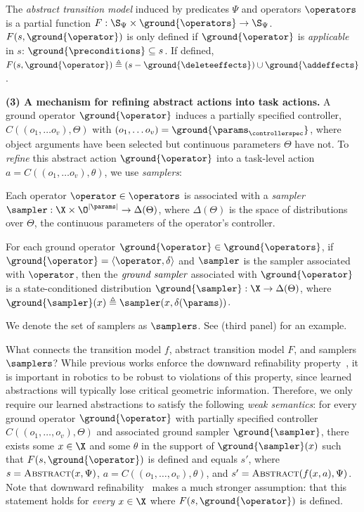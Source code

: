 \begin{defn}
\label{def:absmodel}
The \emph{abstract transition model} induced by predicates $\Psi$ and operators $\operators$ is a partial function $F : \S_\Psi \times \ground{\operators} \to \S_\Psi$. $F(s, \ground{\operator})$ is only defined if $\ground{\operator}$ is \emph{applicable} in $s$:  $\ground{\preconditions} \subseteq s$. If defined, $F(s, \ground{\operator}) \triangleq (s - \ground{\deleteeffects}) \cup \ground{\addeffects}$.
\end{defn}

\textbf{(3) A mechanism for refining abstract actions into task actions.} A ground operator $\ground{\operator}$ induces a partially specified controller, $C((o_1, \ldots o_v), \Theta)$ with $(o_1, \ldots o_v) = \ground{\params_{\controllerspec}}$, where object arguments have been selected but continuous parameters $\Theta$ have not. To \emph{refine} this abstract action $\ground{\operator}$ into a task-level action $a = C((o_1, \ldots o_v), \theta)$, we use \emph{samplers}:

\begin{defn}[Sampler]
Each operator $\operator \in \operators$ is associated with a \emph{sampler} $\sampler : \X \times \O^{|\params|} \to \Delta(\Theta)$, where $\Delta(\Theta)$ is the space of distributions over $\Theta$, the continuous parameters of the operator's controller.
\end{defn}

\begin{defn}
For each ground operator $\ground{\operator} \in \ground{\operators}$, if $\ground{\operator} = \langle \operator, \delta \rangle$ and $\sampler$ is the sampler associated with $\operator$, then the $\emph{ground sampler}$ associated with $\ground{\operator}$ is a state-conditioned distribution $\ground{\sampler} : \X \to \Delta(\Theta)$, where $\ground{\sampler}(x) \triangleq \sampler(x, \delta(\params))$.
\end{defn}

We denote the set of samplers as $\samplers$. See  (third panel) for an example.

What connects the transition model $f$, abstract transition model $F$, and samplers $\samplers$? While previous works enforce the downward refinability property~\cite{marthi2007angelic,pasula2007learning,jetchev2013learning,konidaris2018skills}, it is important in robotics to be robust to violations of this property, since learned abstractions will typically lose critical geometric information.
Therefore, we only require our learned abstractions to satisfy the following \emph{weak semantics}:
for every ground operator $\ground{\operator}$ with partially specified controller $C((o_1, \dots, o_v), \Theta)$ and associated ground sampler $\ground{\sampler}$, there exists some $x \in \X$ and some $\theta$ in the support of $\ground{\sampler}(x)$ such that $F(s, \ground{\operator})$ is defined and equals $s'$, where $s = \textsc{Abstract}(x, \Psi)$, $a = C((o_1, \dots, o_v), \theta)$, and $s' = \textsc{Abstract}(f(x, a), \Psi)$.
Note that downward refinability~\cite{marthi2007angelic} makes a much stronger assumption: that this statement holds for \emph{every} $x \in \X$ where $F(s, \ground{\operator})$ is defined.